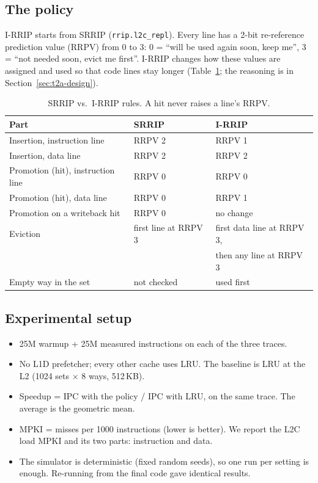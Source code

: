 \documentclass[11pt]{article}
\begin{document}
\subsection{The policy}
I-RRIP starts from SRRIP (\texttt{rrip.l2c\_repl}). Every line has a 2-bit
re-reference prediction value (RRPV) from 0 to 3: 0 = ``will be used again
soon, keep me'', 3 = ``not needed soon, evict me first''. I-RRIP changes how
these values are assigned and used so that code lines stay longer
(Table~\ref{tab:t2a-rules}; the reasoning is in Section~\ref{sec:t2a-design}).

\begin{table}[H]
\centering
\begin{tabular}{lll}
\toprule
Part & SRRIP & I-RRIP\\
\midrule
Insertion, instruction line & RRPV 2 & RRPV 1\\
Insertion, data line & RRPV 2 & RRPV 2\\
Promotion (hit), instruction line & RRPV 0 & RRPV 0\\
Promotion (hit), data line & RRPV 0 & RRPV 1\\
Promotion on a writeback hit & RRPV 0 & no change\\
Eviction & first line at RRPV 3 & first data line at RRPV 3,\\
         &                      & then any line at RRPV 3\\
Empty way in the set & not checked & used first\\
\bottomrule
\end{tabular}
\caption{SRRIP vs.\ I-RRIP rules. A hit never raises a line's RRPV.}
\label{tab:t2a-rules}
\end{table}

\subsection{Experimental setup}
\begin{itemize}
  \item 25M warmup + 25M measured instructions on each of the three traces.
  \item No L1D prefetcher; every other cache uses LRU. The baseline is LRU at
        the L2 (1024 sets $\times$ 8 ways, 512\,KB).
  \item Speedup = IPC with the policy / IPC with LRU, on the same trace. The
        average is the geometric mean.
  \item MPKI = misses per 1000 instructions (lower is better). We report the
        L2C load MPKI and its two parts: instruction and data.
  \item The simulator is deterministic (fixed random seeds), so one run per
        setting is enough. Re-running from the final code gave identical
        results.
\end{itemize}
\end{document}
